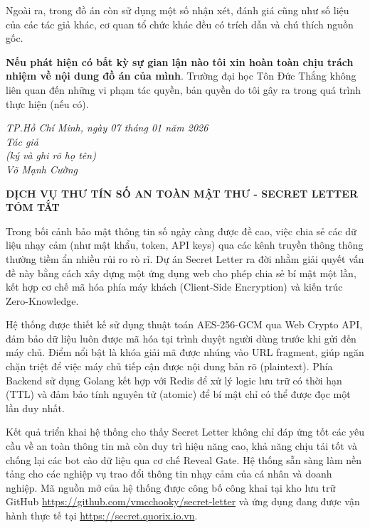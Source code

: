 \documentclass[13pt,a4paper]{extreport}
\begin{document}
Ngoài ra, trong đồ án còn sử dụng một số nhận xét, đánh giá cũng như số liệu của các tác giả khác, cơ quan tổ chức khác đều có trích dẫn và chú thích nguồn gốc.

\textbf{Nếu phát hiện có bất kỳ sự gian lận nào tôi xin hoàn toàn chịu trách nhiệm về nội dung đồ án của mình}. Trường đại học Tôn Đức Thắng không liên quan đến những vi phạm tác quyền, bản quyền do tôi gây ra trong quá trình thực hiện (nếu có).
\begin{center}
    \textit{
        \hspace*{5cm}TP.Hồ Chí Minh, ngày 07 tháng 01 năm 2026 \\
    	\hspace*{5cm}Tác giả\\
    	\hspace*{5cm}(ký và ghi rõ họ tên)\\
    	\vspace*{0.2cm}
    	\vspace*{2cm}
    	\hspace*{5cm}Võ Mạnh Cường\\
        \vspace*{0.2cm}
    }
\end{center}
\newpage

\begin{center}\fontsize{16pt}{18pt}
    \textbf{DỊCH VỤ THƯ TÍN SỐ AN TOÀN MẬT THƯ - SECRET LETTER\\}
    \textbf{TÓM TẮT}
\end{center}

Trong bối cảnh bảo mật thông tin số ngày càng được đề cao, việc chia sẻ các dữ liệu nhạy cảm (như mật khẩu, token, API keys) qua các kênh truyền thông thông thường tiềm ẩn nhiều rủi ro rò rỉ. Dự án Secret Letter ra đời nhằm giải quyết vấn đề này bằng cách xây dựng một ứng dụng web cho phép chia sẻ bí mật một lần, kết hợp cơ chế mã hóa phía máy khách (Client-Side Encryption) và kiến trúc Zero-Knowledge.

Hệ thống được thiết kế sử dụng thuật toán AES-256-GCM qua Web Crypto API, đảm bảo dữ liệu luôn được mã hóa tại trình duyệt người dùng trước khi gửi đến máy chủ. Điểm nổi bật là khóa giải mã được nhúng vào URL fragment, giúp ngăn chặn triệt để việc máy chủ tiếp cận được nội dung bản rõ (plaintext). Phía Backend sử dụng Golang kết hợp với Redis để xử lý logic lưu trữ có thời hạn (TTL) và đảm bảo tính nguyên tử (atomic) để bí mật chỉ có thể được đọc một lần duy nhất.

Kết quả triển khai hệ thống cho thấy Secret Letter không chỉ đáp ứng tốt các yêu cầu về an toàn thông tin mà còn duy trì hiệu năng cao, khả năng chịu tải tốt và chống lại các bot cào dữ liệu qua cơ chế Reveal Gate. Hệ thống sẵn sàng làm nền tảng cho các nghiệp vụ trao đổi thông tin nhạy cảm của cá nhân và doanh nghiệp. Mã nguồn mở của hệ thống được công bố công khai tại kho lưu trữ GitHub \url{https://github.com/vmcchooky/secret-letter} và ứng dụng đang được vận hành thực tế tại \url{https://secret.quorix.io.vn}.
\end{document}
